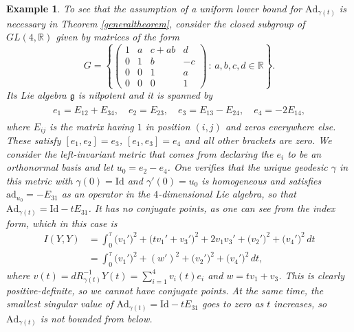 \documentclass[oneside, 11pt]{amsart}
\newtheorem{example}[theorem]{Example}
\numberwithin{equation}{section}
\newcommand{\ad}{\mathrm{ad}}
\newcommand{\Ad}{\mathrm{Ad}}
\newcommand{\Id}{\mathrm{Id}}
\newcommand{\unit}{E}
\newcommand{\heis}{e}
\begin{document}
\begin{example}\label{ex_no_conjugate}
To see that the assumption of a uniform lower bound for $\mathrm{Ad}_{\gamma(t)}$ is necessary in Theorem \ref{generaltheorem}, consider the closed subgroup of $GL(4, \mathbb{R})$ given by matrices of the form
\begin{equation*}%
G = \left\{ 
\left(\begin{matrix}
1 & a & c+ab & d \\
0 & 1 & b & -c \\
0 & 0 & 1 & a \\
0 & 0 & 0 & 1 
\end{matrix}\right) \, : \, a, b, c, d \in \mathbb{R} \right\}.
\end{equation*}
Its Lie algebra $\mathfrak{g}$ is nilpotent and it is spanned by 
\begin{gather*}
\begin{split}
\heis_1 = \unit_{12} + \unit_{34},\quad 
\heis_2 = \unit_{23},\quad
\heis_3 = \unit_{13} - \unit_{24}, \quad
\heis_4 = -2\unit_{14}, 
\end{split}
\end{gather*}
where $\unit_{ij}$ is the matrix having $1$ in position $(i, j)$ and zeros everywhere else. These satisfy $[\heis_1, \heis_2] = \heis_3$, $[\heis_1, \heis_3] = \heis_4$ and all other brackets are zero. We consider the left-invariant metric that comes from declaring the $\heis_i$ to be an orthonormal basis and let $u_0 = \heis_2 - \heis_4$. One verifies that the unique geodesic $\gamma$ in this metric with $\gamma(0) = \mathrm{Id}$ and $\gamma'(0) = u_0$ is homogeneous and satisfies $\ad_{u_0}=-\unit_{31}$ as an operator in the $4$-dimensional Lie algebra, so that $\Ad_{\gamma(t)} = \Id - t \unit_{31}$. It has no conjugate points, as one can see from the index form, which in this case is 
\begin{align*}
I(Y, Y) &= \int_0^{\tau} \big(v_1'\big)^2 + \big(tv_1'+v_3'\big)^2 + 2v_1v_3' + \big(v_2'\big)^2 + \big(v_4'\big)^2\,dt \\ 
&= \int_0^{\tau} \big(v_1'\big)^2 + (w')^2 + \big(v_2'\big)^2 + \big(v_4'\big)^2\,dt,
\end{align*}
where $v(t) = dR_{\gamma(t)}^{-1}Y(t) =  \sum\limits_{i = 1}^4 v_i(t)\heis_i$ and $w = tv_1 + v_3$. This is clearly positive-definite, so we cannot have conjugate points. At the same time, the smallest singular value of $\mathrm{Ad}_{\gamma(t)} = \mathrm{Id} - t\unit_{31}$ goes to zero as $t$ increases, so $\mathrm{Ad}_{\gamma(t)}$ is not bounded from below.
\end{example}
  
\end{document}
